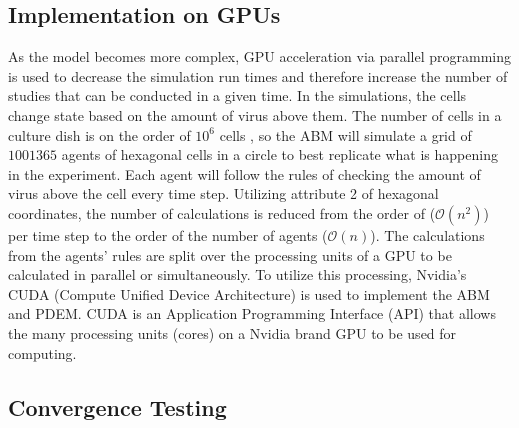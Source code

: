 
\subsection{Implementation on GPUs}

As the model becomes more complex, GPU acceleration via parallel programming is used to decrease the simulation run times and therefore increase the number of studies that can be conducted in a given time. In the simulations, the cells change state based on the amount of virus above them. The number of cells in a culture dish is on the order of $10^6$ cells \citep{Number_of_cells_in_a_dish_noauthor_useful_nodate}, so the ABM will simulate a grid of $1001365$ agents of hexagonal cells in a circle to best replicate what is happening in the experiment. Each agent will follow the rules of checking the amount of virus above the cell every time step. Utilizing attribute 2 of hexagonal coordinates, the number of calculations is reduced from the order of ($\mathcal{O}(n^2)$) per time step to the order of the number of agents ($\mathcal{O}(n)$). The calculations from the agents' rules are split over the processing units of a GPU to be calculated in parallel or simultaneously. To utilize this processing, Nvidia's CUDA (Compute Unified Device Architecture) is used to implement the ABM and PDEM. CUDA is an Application Programming Interface (API) that allows the many processing units (cores) on a Nvidia brand GPU to be used for computing. %



\subsection{Convergence Testing}

